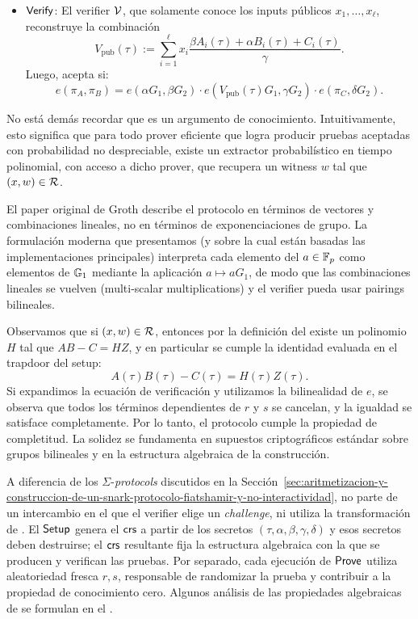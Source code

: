\begin{definition}
\begin{itemize}
\begin{enumerate}
		\end{enumerate}
			El \textit{output} del algoritmo $\Prove$ es la tripla $\pi = (\pi_A, \pi_B, \pi_C) \in (\GOne, \GTwo, \GOne)$.
			\item $\mathsf{Verify}$: El verifier $\mathcal{V}$, que solamente conoce los inputs públicos $x_1,\ldots,x_\ell$, reconstruye la combinación
			$$V_{\mathrm{pub}}(\tau) := \sum_{i=1}^{\ell} x_i \frac{\beta A_i(\tau) + \alpha B_i(\tau) + C_i(\tau)}{\gamma}.$$
			Luego, acepta si:
			$$e(\pi_A, \pi_B) = e(\alpha G_1, \beta G_2) \cdot e\!\left(V_{\mathrm{pub}}(\tau) G_1, \gamma G_2\right) \cdot e(\pi_C, \delta G_2).$$
		\end{itemize}
	\end{definition}

No está demás recordar que \Groth es un argumento de conocimiento. Intuitivamente, esto significa que para todo prover eficiente que logra producir pruebas aceptadas con probabilidad no despreciable, existe un extractor probabilístico en tiempo polinomial, con acceso a dicho prover, que recupera un witness $w$ tal que $(x, w) \in \mathcal{R}$.

El paper original de Groth \cite{cryptoeprint:2016/260} describe el protocolo en términos de vectores y combinaciones lineales, no en términos de exponenciaciones de grupo. La formulación moderna que presentamos (y sobre la cual están basadas las implementaciones principales) interpreta cada elemento del \SRS $a \in \mathbb{F}_p$ como elementos de $\mathbb{G}_1$ mediante la aplicación $a \mapsto aG_1$, de modo que las combinaciones lineales se vuelven \MSM (multi-scalar multiplications) y el verifier pueda usar pairings bilineales.

Observamos que si $(x, w) \in \mathcal{R}$, entonces por la definición del \QAP existe un polinomio $H$ tal que $AB - C = HZ$, y en particular se cumple la identidad evaluada en el trapdoor del setup:
$$A(\tau)B(\tau) - C(\tau) = H(\tau)Z(\tau).$$
Si expandimos la ecuación de verificación y utilizamos la bilinealidad de $e$, se observa que todos los términos dependientes de $r$ y $s$ se cancelan, y la igualdad se satisface completamente. Por lo tanto, el protocolo cumple la propiedad de completitud. La solidez se fundamenta en supuestos criptográficos estándar sobre grupos bilineales y en la estructura algebraica de la construcción.

A diferencia de los $\Sigma$-\textit{protocols} discutidos en la Sección~\ref{sec:aritmetizacion-y-construccion-de-un-snark-protocolo-fiatshamir-y-no-interactividad}, \Groth no parte de un intercambio en el que el verifier elige un \textit{challenge}, ni utiliza la transformación de \FiatShamir. El $\mathsf{Setup}$ genera el $\mathsf{crs}$ a partir de los secretos $(\tau,\alpha,\beta,\gamma,\delta)$ y esos secretos deben destruirse; el $\mathsf{crs}$ resultante fija la estructura algebraica con la que se producen y verifican las pruebas. Por separado, cada ejecución de $\Prove$ utiliza aleatoriedad fresca $r,s$, responsable de randomizar la prueba y contribuir a la propiedad de conocimiento cero. Algunos análisis de las propiedades algebraicas de \Groth se formulan en el \AGM \cite{Fuchsbauer2018}.

